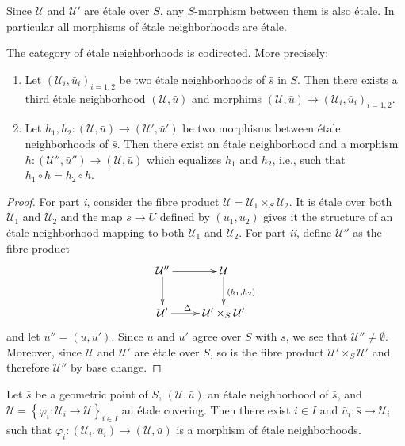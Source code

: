 \begin{remark}
\label{remark-etale-between-etale}
Since $\mathcal{U}$ and $\mathcal{U}'$ are \'etale over $S$, any $S$-morphism
between them is also \'etale. In particular all morphisms of \'etale
neighborhoods are \'etale.
\end{remark}

\begin{lemma}
\label{lemma-cofinal-etale}
The category of \'etale neighborhoods is codirected. More precisely:
\begin{enumerate}
\item Let $(\mathcal{U}_i, \bar u_i)_{i=1, 2}$ be two \'etale neighborhoods of
$\bar s$ in $S$. Then there exists a third \'etale neighborhood $(\mathcal{U},
\bar u)$ and morphims $(\mathcal{U}, \bar u) \to (\mathcal{U}_i, \bar
u_i)_{i=1,2}$.
\item Let $h_1, h_2: (\mathcal{U}, \bar u) \to (\mathcal{U}', \bar u')$ be two
morphisms between \'etale neighborhoods of $\bar s$. Then there exist an
\'etale neighborhood and a morphism $h : (\mathcal{U}'', \bar u'')\to
(\mathcal{U}, \bar u)$ which equalizes $h_1$ and $h_2$, i.e., such that
$h_1\circ h = h_2\circ h$.		
\end{enumerate}
\end{lemma}

\begin{proof}
For part {\it i}, consider the fibre product $\mathcal{U} = \mathcal{U}_1
\times_S \mathcal{U}_2$. It is \'etale over both $\mathcal{U}_1$ and
$\mathcal{U}_2$ and the map $\bar s \to U$ defined by $(\bar u_1, \bar u_2)$
gives it the structure of an \'etale neighborhood mapping to both
$\mathcal{U}_1$ and $\mathcal{U}_2$. For part {\it ii}, define $\mathcal{U}''$
as the fibre product
$$
\xymatrix{
{\mathcal{U}''} \ar[r] \ar[d] & {\mathcal{U}} \ar^{(h_1,h_2)}[d] \\
{\mathcal{U}'} \ar^{\Delta \quad}[r] & {\mathcal{U}' \times_S \mathcal{U}'}
}
$$
and let $\bar u'' = (\bar u, \bar u')$. Since $\bar u$ and $\bar u'$ agree over
$S$ with $\bar s$, we see that $\mathcal{U}''\neq\emptyset$. Moreover, since
$\mathcal{U}$ and $\mathcal{U}'$ are \'etale over $S$, so is the fibre product
$\mathcal{U}'\times_S \mathcal{U}'$ and therefore $\mathcal{U}''$ by base
change.
\end{proof}

\begin{lemma}
\label{lemma-geometric-lift-to-cover}
Let $\bar s$ be a geometric point of $S$, $(\mathcal{U}, \bar u)$ an \'etale
neighborhood of $\bar s$, and $\mathcal{U} = \left\{\varphi_i : \mathcal{U}_i
\to \mathcal{U} \right\}_{i\in I}$ an \'etale covering. Then there exist $i\in
I$ and $\bar u_i: \bar s \to \mathcal{U}_i$ such that $\varphi_i:
(\mathcal{U}_i, \bar u_i) \to (\mathcal{U}, \bar u)$ is a morphism of \'etale
neighborhoods.
\end{lemma}

